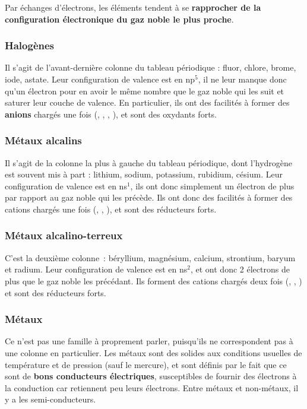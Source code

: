 \documentclass[../../main/main.tex]{subfiles}
\begin{document}
Par échanges d'électrons, les éléments tendent à se \textbf{rapprocher de la
	configuration électronique du gaz noble le plus proche}.

\subsubsection{Halogènes}
Il s'agit de l'avant-dernière colonne du tableau périodique : fluor, chlore,
brome, iode, astate. Leur configuration de valence est en np$^5$, il ne leur
manque donc qu'un électron pour en avoir le même nombre que le gaz noble qui les
suit et saturer leur couche de valence. En particulier, ils ont des facilités à
former des \textbf{anions} chargés une fois (, , ,
), et sont des oxydants forts.

\subsubsection{Métaux alcalins}
Il s'agit de la colonne la plus à gauche du tableau périodique, dont l'hydrogène
est souvent mis à part : lithium, sodium, potassium, rubidium, césium. Leur
configuration de valence est en ns$^1$, ils ont donc simplement un électron de
plus par rapport au gaz noble qui les précède. Ils ont donc des facilités à
former des cations chargés une fois (, , ), et sont des
réducteurs forts.

\subsubsection{Métaux alcalino-terreux}
C'est la deuxième colonne~: béryllium, magnésium, calcium, strontium, baryum et
radium. Leur configuration de valence est en ns$^{2}$, et ont donc 2 électrons
de plus que le gaz noble les précédant. Ils forment des cations chargés deux
fois (, , ) et sont des réducteurs forts.

\subsubsection{Métaux}
Ce n'est pas une famille à proprement parler, puisqu'ils ne correspondent pas à
une colonne en particulier. Les métaux sont des solides aux conditions usuelles
de température et de pression (sauf le mercure), et sont définis par le fait que
ce sont de \textbf{bons conducteurs électriques}, susceptibles de fournir des
électrons à la conduction car retiennent peu leurs électrons. Entre métaux et
non-métaux, il y a les semi-conducteurs.
\end{document}
